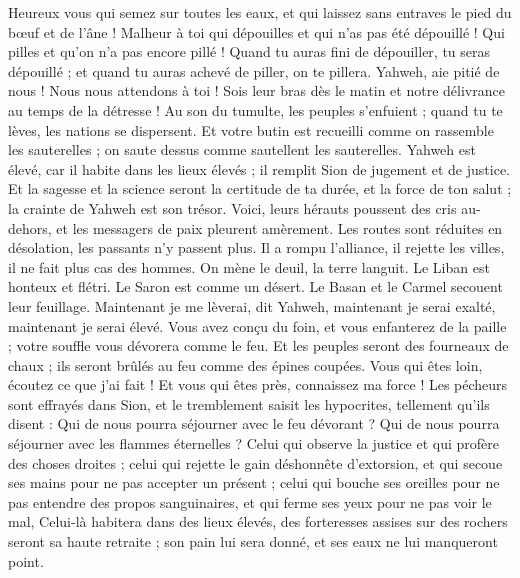 \begin{multicols}{2}
Heureux vous qui semez sur toutes les eaux, et qui laissez sans entraves le pied du bœuf et de l'âne !
\VerseOne{}Malheur à toi qui dépouilles et qui n'as pas été dépouillé ! Qui pilles et qu'on n'a pas encore pillé ! Quand tu auras fini de dépouiller, tu seras dépouillé ; et quand tu auras achevé de piller, on te pillera.
Yahweh, aie pitié de nous ! Nous nous attendons à toi ! Sois leur bras dès le matin et notre délivrance au temps de la détresse !
Au son du tumulte, les peuples s'enfuient ; quand tu te lèves, les nations se dispersent.
Et votre butin est recueilli comme on rassemble les sauterelles ; on saute dessus comme sautellent les sauterelles.
Yahweh est élevé, car il habite dans les lieux élevés ; il remplit Sion de jugement et de justice.
Et la sagesse et la science seront la certitude de ta durée, et la force de ton salut ; la crainte de Yahweh est son trésor.
Voici, leurs hérauts poussent des cris au-dehors, et les messagers de paix pleurent amèrement.
Les routes sont réduites en désolation, les passants n'y passent plus. Il a rompu l'alliance, il rejette les villes, il ne fait plus cas des hommes.
On mène le deuil, la terre languit. Le Liban est honteux et flétri. Le Saron est comme un désert. Le Basan et le Carmel secouent leur feuillage.
Maintenant je me lèverai, dit Yahweh, maintenant je serai exalté, maintenant je serai élevé.
Vous avez conçu du foin, et vous enfanterez de la paille ; votre souffle vous dévorera comme le feu.
Et les peuples seront des fourneaux de chaux ; ils seront brûlés au feu comme des épines coupées.
Vous qui êtes loin, écoutez ce que j'ai fait ! Et vous qui êtes près, connaissez ma force !
Les pécheurs sont effrayés dans Sion, et le tremblement saisit les hypocrites, tellement qu'ils disent : Qui de nous pourra séjourner avec le feu dévorant ? Qui de nous pourra séjourner avec les flammes éternelles ?
Celui qui observe la justice et qui profère des choses droites ; celui qui rejette le gain déshonnête d'extorsion, et qui secoue ses mains pour ne pas accepter un présent ; celui qui bouche ses oreilles pour ne pas entendre des propos sanguinaires, et qui ferme ses yeux pour ne pas voir le mal,
Celui-là habitera dans des lieux élevés, des forteresses assises sur des rochers seront sa haute retraite ; son pain lui sera donné, et ses eaux ne lui manqueront point.

\end{multicols}
